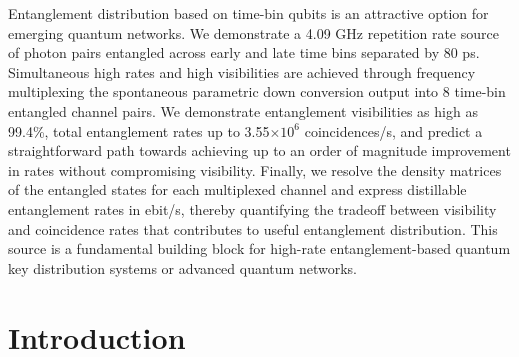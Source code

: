 \documentclass[11pt]{caltech_thesis} %
\begin{document}
Entanglement distribution based on time-bin qubits is an attractive option for emerging quantum networks. We demonstrate a 4.09 GHz repetition rate source of photon pairs entangled across early and late time bins separated by 80 ps. Simultaneous high rates and high visibilities are achieved through frequency multiplexing the spontaneous parametric down conversion output into 8 time-bin entangled channel pairs. We demonstrate entanglement visibilities as high as 99.4\%, total entanglement rates up to 3.55$\times 10^6$ coincidences/s, and predict a straightforward path towards achieving up to an order of magnitude improvement in rates without compromising visibility. Finally, we resolve the density matrices of the entangled states for each multiplexed channel and express distillable entanglement rates in ebit/s, thereby quantifying the tradeoff between visibility and coincidence rates that contributes to useful entanglement distribution. This source is a fundamental building block for high-rate entanglement-based quantum key distribution systems or advanced quantum networks.

\hypertarget{introduction-4}{%
\section{Introduction}\label{introduction-4}}
\end{document}
